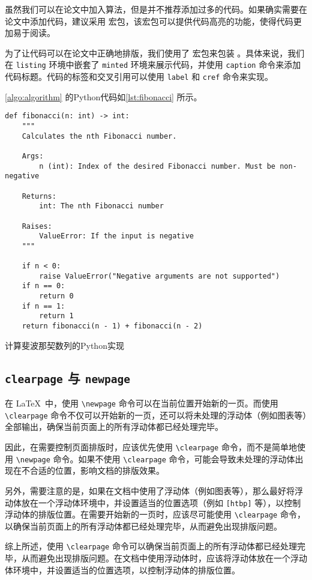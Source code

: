 虽然我们可以在论文中加入算法，但是并不推荐添加过多的代码。如果确实需要在论文中添加代码，建议采用  宏包，该宏包可以提供代码高亮的功能，使得代码更加易于阅读。

为了让代码可以在论文中正确地排版，我们使用了  宏包来包装 。具体来说，我们在 \texttt{listing} 环境中嵌套了 \texttt{minted} 环境来展示代码，并使用 \texttt{caption} 命令来添加代码标题。代码的标签和交叉引用可以使用 \texttt{label} 和 \texttt{cref} 命令来实现。

\cref{algo:algorithm} 的Python代码如\cref{lst:fibonacci} 所示。

\begin{listing}[htbp]
    \begin{verbatim}
def fibonacci(n: int) -> int:
    """
    Calculates the nth Fibonacci number.

    Args:
        n (int): Index of the desired Fibonacci number. Must be non-negative

    Returns:
        int: The nth Fibonacci number

    Raises:
        ValueError: If the input is negative
    """

    if n < 0:
        raise ValueError("Negative arguments are not supported")
    if n == 0:
        return 0
    if n == 1:
        return 1
    return fibonacci(n - 1) + fibonacci(n - 2)
  \end{verbatim}
    \caption{计算斐波那契数列的Python实现}\label{lst:fibonacci}
\end{listing}

\subsection{\texttt{clearpage} 与 \texttt{newpage}}

在 \LaTeX\ 中，使用 \verb|\newpage| 命令可以在当前位置开始新的一页。而使用 \verb|\clearpage| 命令不仅可以开始新的一页，还可以将未处理的浮动体（例如图表等）全部输出，确保当前页面上的所有浮动体都已经处理完毕。

因此，在需要控制页面排版时，应该优先使用 \verb|\clearpage| 命令，而不是简单地使用 \verb|\newpage| 命令。如果不使用 \verb|\clearpage| 命令，可能会导致未处理的浮动体出现在不合适的位置，影响文档的排版效果。

另外，需要注意的是，如果在文档中使用了浮动体（例如图表等），那么最好将浮动体放在一个浮动体环境中，并设置适当的位置选项（例如 \verb|[htbp]| 等），以控制浮动体的排版位置。在需要开始新的一页时，应该尽可能使用 \verb|\clearpage| 命令，以确保当前页面上的所有浮动体都已经处理完毕，从而避免出现排版问题。

综上所述，使用 \verb|\clearpage| 命令可以确保当前页面上的所有浮动体都已经处理完毕，从而避免出现排版问题。在文档中使用浮动体时，应该将浮动体放在一个浮动体环境中，并设置适当的位置选项，以控制浮动体的排版位置。